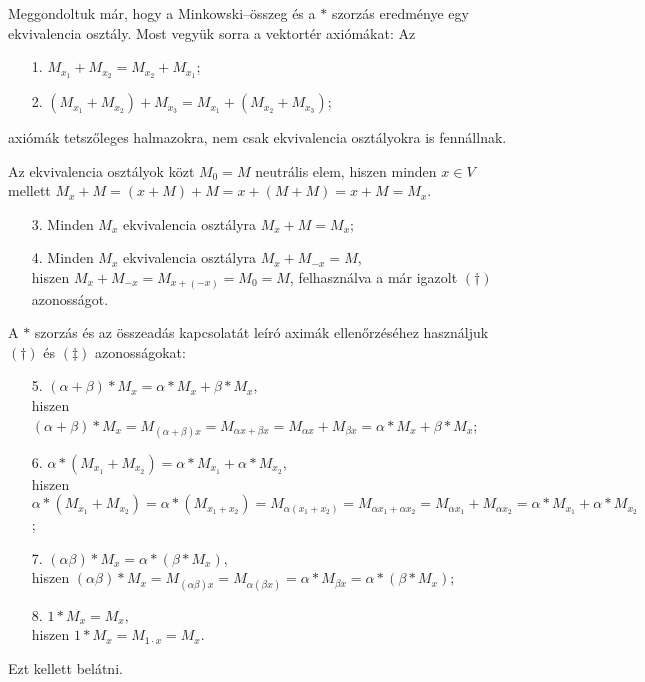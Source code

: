 \documentclass[9pt, a4paper, showtrims]{memoir}
\makeatletter
\renewenvironment{proof}[1][\proofname]
    {\par\pushQED{\qed}%
    \normalfont \topsep6\p@\@plus6\p@\relax
    \trivlist
    \item[\hskip\labelsep
        \itshape
    #1\@addpunct{:}]\ignorespaces}
    {\popQED\endtrivlist\@endpefalse}
\theoremstyle{plain}
\theoremstyle{remark}
\theoremstyle{definition}
\makeatother
\begin{document}
\begin{proof}
	Meggondoltuk már, hogy a Minkowski--összeg és a $\ast$ szorzás eredménye egy ekvivalencia osztály.
	Most vegyük sorra a vektortér axiómákat:
	Az
	\begin{enumerate}
		\item[1.] $M_{x_1}+M_{x_{2}}=M_{x_2}+M_{x_1}$;
		\item[2.] $\left( M_{x_1}+M_{x_2} \right)+M_{x_3}=
			      M_{x_1}+\left( M_{x_2}+M_{x_3} \right)$;
	\end{enumerate}
	axiómák tetszőleges halmazokra, nem csak ekvivalencia osztályokra is fennállnak.

	Az ekvivalencia osztályok közt $M_0=M$ neutrális elem,
	hiszen minden $x\in V$ mellett $M_x+M=\left( x+M \right)+M=x+\left( M+M \right)=x+M=M_x$.
	\begin{enumerate}
		\item[3.] Minden $M_x$ ekvivalencia osztályra $M_x+M=M_x$;
		\item[4.] Minden $M_x$ ekvivalencia osztályra $M_x+M_{-x}=M$,\\
		      hiszen
		      $M_x+M_{-x}=M_{x+\left( -x \right)}=M_0=M$,
		      felhasználva a már igazolt $(\dag)$ azonosságot.
	\end{enumerate}
	A $\ast$ szorzás és az összeadás kapcsolatát leíró aximák ellenőrzéséhez használjuk
	$(\dag)$ és $(\ddag)$ azonosságokat:
	\begin{enumerate}
		\item[5.] $\left( \alpha+\beta \right)\ast M_x=\alpha\ast M_x+\beta\ast M_x$,\\
		      hiszen
		      $\left( \alpha+\beta \right)\ast M_x
			      =
			      M_{\left( \alpha+\beta \right)x}
			      =
			      M_{\alpha x+\beta x}
			      =
			      M_{\alpha x}+M_{\beta x}
			      =
			      \alpha\ast M_x+\beta\ast M_x$;
		\item[6.] $\alpha\ast\left( M_{x_1}+M_{x_2} \right)
			      =
			      \alpha\ast M_{x_1}+\alpha\ast M_{x_2}$,\\
		      hiszen
		      $
			      \alpha\ast\left( M_{x_1}+M_{x_2} \right)
			      =
			      \alpha\ast\left( M_{x_1+x_2} \right)
			      =
			      M_{\alpha(x_1+x_2)}
			      =
			      M_{\alpha x_1+\alpha x_2}
			      =
			      M_{\alpha x_1}+M_{\alpha x_2}
			      =
			      \alpha\ast M_{x_1}+\alpha\ast M_{x_2}$;
		\item[7.] $
			      \left( \alpha\beta \right)\ast M_{x}=
			      \alpha\ast\left( \beta\ast M_{x} \right)$,\\
		      hiszen
		      $
			      \left( \alpha\beta \right)\ast M_{x}
			      =
			      M_{\left( \alpha\beta \right)x}
			      =
			      M_{\alpha\left( \beta x \right)}
			      =
			      \alpha\ast M_{\beta x}
			      =
			      \alpha\ast\left( \beta\ast M_x \right)
		      $;
		\item[8.]
		      $
			      1\ast M_{x}=M_{x},
		      $
		      \\hiszen
		      $
			      1\ast M_{x}=M_{1\cdot x}=M_x.
		      $
	\end{enumerate}
	Ezt kellett belátni.
\end{proof}
\end{document}
